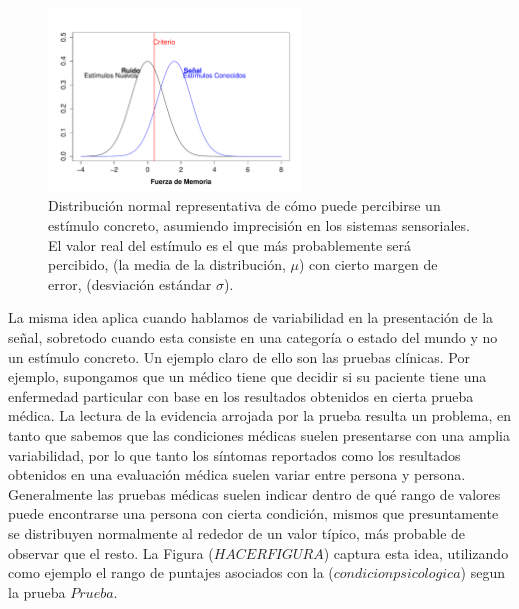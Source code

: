 \begin{itemize}
\begin{itemize}
\begin{figure}[th]
\centering
\includegraphics[width=0.60\textwidth]{Figures/RM_SDT_1} 
\decoRule
\caption[Variabilidad en la percepción de la señal]{Distribución normal representativa de cómo puede percibirse un estímulo concreto, asumiendo imprecisión en los sistemas sensoriales. El valor real del estímulo es el que más probablemente será percibido, (la media de la distribución, $\mu$) con cierto margen de error, (desviación estándar $\sigma$).}
\label{fig:Senal_percepcion}
\end{figure}

La misma idea aplica cuando hablamos de variabilidad en la presentación de la señal, sobretodo cuando esta consiste en una categoría o estado del mundo y no un estímulo concreto. Un ejemplo claro de ello son las pruebas clínicas. Por ejemplo, supongamos que un médico tiene que decidir si su paciente tiene una enfermedad particular con base en los resultados obtenidos en cierta prueba médica. La lectura de la evidencia arrojada por la prueba resulta un problema, en tanto que sabemos que las condiciones médicas suelen presentarse con una amplia variabilidad, por lo que tanto los síntomas reportados como los resultados obtenidos en una evaluación médica suelen variar entre persona y persona. Generalmente las pruebas médicas suelen indicar dentro de qué rango de valores puede encontrarse una persona con cierta condición, mismos que presuntamente se distribuyen normalmente al rededor de un valor típico, más probable de observar que el resto. La Figura ($HACER FIGURA$) captura esta idea, utilizando como ejemplo el rango de puntajes asociados con la ($condicion psicologica$) segun la prueba $Prueba$.\\



\end{itemize}
\end{itemize}
